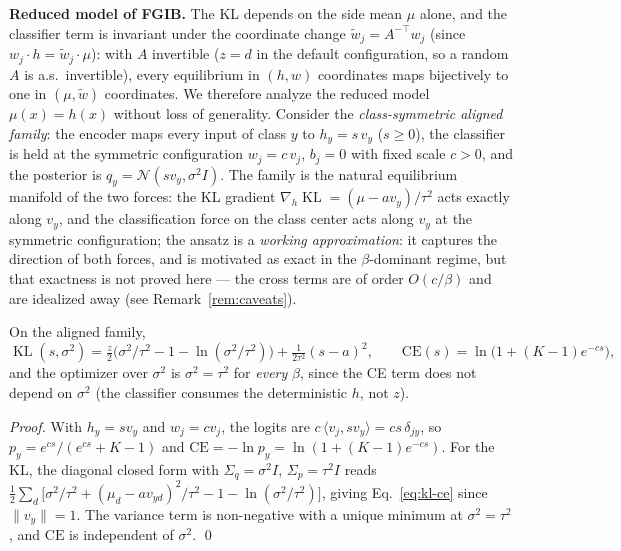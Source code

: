\textbf{Reduced model of FGIB.}
The KL depends on the side mean $\mu$ alone, and the classifier term is invariant under
the coordinate change $\tilde w_j = A^{-\top} w_j$ (since $w_j \cdot h =
\tilde w_j \cdot \mu$): with $A$ invertible ($z = d$ in the default configuration, so a
random $A$ is a.s.\ invertible), every equilibrium in $(h, w)$ coordinates maps
bijectively to one in $(\mu, \tilde w)$ coordinates. We therefore analyze the reduced
model $\mu(x) = h(x)$ without loss of generality.
Consider the \emph{class-symmetric aligned family}: the encoder maps every input of
class $y$ to $h_y = s\,v_y$ ($s \ge 0$), the classifier is held at the symmetric
configuration $w_j = c\,v_j$, $b_j = 0$ with fixed scale $c > 0$, and the posterior is
$q_y = \mathcal{N}(s v_y, \sigma^2 I)$. The family is the natural equilibrium manifold of
the two forces: the KL gradient
$\nabla_h \operatorname{KL} = (\mu - a v_y)/\tau^2$ acts exactly
along $v_y$, and the classification force on the class center acts along $v_y$ at the
symmetric configuration; the ansatz is a \emph{working approximation}: it captures the
direction of both forces, and is motivated as exact in the $\beta$-dominant regime, but
that exactness is not proved here --- the cross terms are of order $O(c/\beta)$ and are
idealized away (see Remark~\ref{rem:caveats}).

\begin{lemma}\label{lem:lagrangian}
On the aligned family,
\begin{equation}
\operatorname{KL}(s, \sigma^2)
= \tfrac{z}{2}\big(\sigma^2/\tau^2 - 1 - \ln(\sigma^2/\tau^2)\big)
+ \tfrac{1}{2\tau^2}(s-a)^2,
\qquad
\mathrm{CE}(s) = \ln\!\big(1 + (K-1)e^{-cs}\big),
\label{eq:kl-ce}
\end{equation}
and the optimizer over $\sigma^2$ is $\sigma^2 = \tau^2$ for \emph{every} $\beta$, since
the CE term does not depend on $\sigma^2$ (the classifier consumes the deterministic
$h$, not $z$).
\end{lemma}

\begin{proof}
With $h_y = s v_y$ and $w_j = c v_j$, the logits are $c\,\langle v_j, s v_y\rangle
= cs\,\delta_{jy}$, so $p_y = e^{cs}/(e^{cs} + K - 1)$ and
$\mathrm{CE} = -\ln p_y = \ln(1 + (K-1)e^{-cs})$.
For the KL, the diagonal closed form with $\Sigma_q = \sigma^2 I$,
$\Sigma_p = \tau^2 I$ reads
$\tfrac{1}{2}\sum_d\big[\sigma^2/\tau^2 + (\mu_d - a v_{yd})^2/\tau^2 - 1
- \ln(\sigma^2/\tau^2)\big]$, giving
Eq.~\eqref{eq:kl-ce} since $\|v_y\| = 1$. The variance term is non-negative with a
unique minimum at $\sigma^2 = \tau^2$, and $\mathrm{CE}$ is independent of $\sigma^2$.
\hfill\qed
\end{proof}

